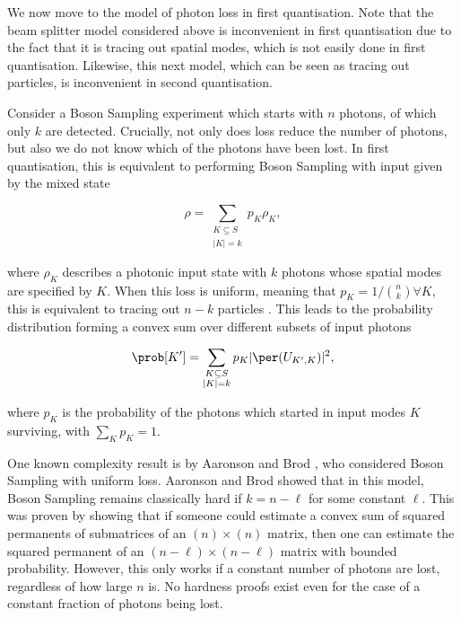 We now move to the model of photon loss in first quantisation. Note that the beam splitter model considered above is inconvenient in first quantisation due to the fact that it is tracing out spatial modes, which is not easily done in first quantisation. Likewise, this next model, which can be seen as tracing out particles, is inconvenient in second quantisation.

Consider a Boson Sampling experiment which starts with $n$ photons, of which only $k$ are detected. Crucially, not only does loss reduce the number of photons, but also we do not know which of the photons have been lost. In first quantisation, this is equivalent to performing Boson Sampling with input given by the mixed state

\begin{equation}
\rho = \sum_{\substack{K \subseteq S\\|K| = k}}p_{K}\rho_K,
\end{equation}

\noindent where $\rho_K$ describes a photonic input state with $k$ photons whose spatial modes are specified by $K$. When this loss is uniform, meaning that $p_K=1/\binom{n}{k}\forall K$, this is equivalent to tracing out $n-k$ particles \cite{oszmaniec2018}. This leads to the probability distribution forming a convex sum over different subsets of input photons

\begin{equation}
\prob[K'] = \sum_{\substack{K \subseteq S\\|K| = k}}p_{K}|\per(U_{K',K})|^2,
\end{equation}

\noindent where $p_K$ is the probability of the photons which started in input modes $K$ surviving, with $\sum_Kp_K = 1$.

One known complexity result is by Aaronson and Brod \cite{aaronson2016}, who considered Boson Sampling with uniform loss. Aaronson and Brod showed that in this model, Boson Sampling remains classically hard if $k=n-\ell$ for some constant $\ell$. This was proven by showing that if someone could estimate a convex sum of squared permanents of submatrices of an $(n)\times(n)$ matrix, then one can estimate the squared permanent of an $(n-\ell)\times(n-\ell)$ matrix with bounded probability. However, this only works if a constant number of photons are lost, regardless of how large $n$ is. No hardness proofs exist even for the case of a constant fraction of photons being lost.

